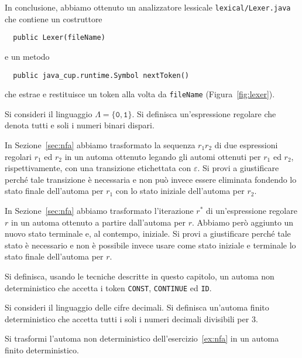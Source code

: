 In conclusione, abbiamo ottenuto un analizzatore lessicale
\texttt{lexical/Lexer.java} che contiene un costruttore
%
\begin{verbatim}
  public Lexer(fileName)
\end{verbatim}
%
e un metodo
%
\begin{verbatim}
  public java_cup.runtime.Symbol nextToken()
\end{verbatim}
%
che estrae e restituisce un token alla volta da \texttt{fileName}
(Figura~\ref{fig:lexer}).
%
\begin{exercise}\label{ex:regular_odd}
Si consideri il linguaggio $\Lambda=\{\mathtt{0},\mathtt{1}\}$.
Si definisca un'espressione regolare che denota tutti e soli i numeri binari
dispari.
\end{exercise}
%
\begin{exercise}\label{ex:r1r2}
In Sezione~\ref{sec:nfa} abbiamo trasformato la sequenza $r_1r_2$ di
due espressioni regolari $r_1$ ed $r_2$ in un automa ottenuto
legando gli automi ottenuti per $r_1$ ed $r_2$, rispettivamente,
con una transizione etichettata con $\varepsilon$. Si provi
a giustificare perch\'e tale transizione \`e necessaria e non
pu\`o invece essere eliminata fondendo lo stato finale
dell'automa per $r_1$ con lo stato iniziale dell'automa per $r_2$.
\end{exercise}
%
\begin{exercise}\label{ex:rstar}
In Sezione~\ref{sec:nfa} abbiamo trasformato l'iterazione $r^*$ di
un'espressione regolare $r$ in un automa ottenuto a partire dall'automa
per $r$. Abbiamo per\`o aggiunto un nuovo stato terminale e, al contempo,
iniziale. Si provi a giustificare perch\'e tale stato \`e necessario e non
\`e possibile invece usare come stato iniziale e terminale
lo stato finale dell'automa per $r$.
\end{exercise}
%
\begin{exercise}\label{ex:nfa}
Si definisca, usando le tecniche descritte in questo capitolo,
un automa non deterministico che accetta i token
\texttt{CONST}, \texttt{CONTINUE} ed \texttt{ID}.
\end{exercise}
%
\begin{exercise}\label{ex:dfa_three}
Si consideri il linguaggio delle cifre decimali. Si definisca un'automa finito
deterministico che accetta tutti i soli i numeri decimali divisibili per $3$.
\end{exercise}
%
\begin{exercise}\label{ex:nfatodfa}
Si trasformi l'automa non deterministico dell'esercizio~\ref{ex:nfa}
in un automa finito deterministico.
\end{exercise}
